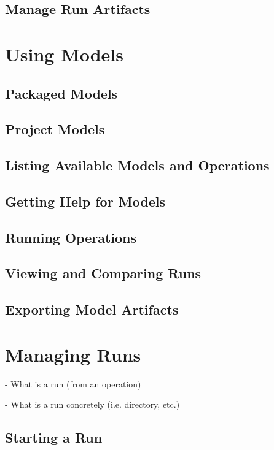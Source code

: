 \documentclass{article}
\begin{document}
\subsection{Manage Run Artifacts}

\section{Using Models}

\subsection{Packaged Models}

\subsection{Project Models}

\subsection{Listing Available Models and Operations}

\subsection{Getting Help for Models}

\subsection{Running Operations}

\subsection{Viewing and Comparing Runs}

\subsection{Exporting Model Artifacts}

\section{Managing Runs}
\label{sec:runs}

- What is a run (from an operation)

- What is a run concretely (i.e. directory, etc.)

\subsection{Starting a Run}
\end{document}
